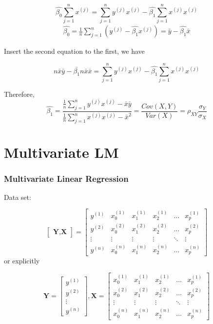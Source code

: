 \documentclass[notheorems, aspectratio=54]{beamer}
\begin{document}
\begin{frame}

$$
\hat{\beta_0}\sum\limits_{j=1}^{n}x^{(j)}=\sum\limits_{j=1}^{n}y^{(j)}x^{(j)}-\hat{\beta_1}\sum\limits_{j=1}^{n}x^{(j)}x^{(j)}
$$
\begin{align*}
\hat{\beta_0}=\frac{1}{n}\sum\limits_{j=1}^{n}(y^{(j)}-\hat{\beta_1} x^{(j)})=\bar{y}-\hat{\beta_1} \bar{x}
\end{align*}

Insert the second equation to the first, we have

$$n\bar{x}\bar{y}-\bar{\beta_1}n\bar{x}\bar{x}=\sum\limits_{j=1}^{n}y^{(j)}x^{(j)}-\hat{\beta_1}\sum\limits_{j=1}^{n}x^{(j)}x^{(j)}
$$

Therefore, 
$$\hat{\beta_1}=\frac{\frac{1}{n}\sum\limits_{j=1}^{n}y^{(j)}x^{(j)}-\bar{x}\bar{y}}{\frac{1}{n}\sum\limits_{j=1}^{n}x^{(j)}x^{(j)}-\bar{x}^2}=\frac{Cov(X,Y)}{Var(X)}=\rho_{XY}\frac{\sigma_{Y}}{\sigma_{X}}$$
\end{frame}

\section{Multivariate LM}
\begin{frame}
\frametitle{Multivariate Linear Regression}
Data set:

$$
\begin{bmatrix}

\textbf{Y}, \textbf{X}

\end{bmatrix}
=
\begin{bmatrix}
    y^{(1)}& x^{(1)}_{0}& x^{(1)}_{1} & x^{(1)}_{2} & \dots & x^{(1)}_{p} \\
    y^{(2)}& x^{(2)}_{0}& x^{(2)}_{1} & x^{(2)}_{2} & \dots & x^{(2)}_{p} \\
	\vdots & \vdots     & \vdots & \vdots &\ddots &\vdots\\
    y^{(n)}&  x^{(n)}_{0}& x^{(n)}_{1} & x^{(n)}_{2} & \dots & x^{(n)}_{p}
\end{bmatrix}
$$
or explicitly 

$$
\textbf{Y}=
\begin{bmatrix}
    y^{(1)} \\
    y^{(2)} \\
	\vdots \\
    y^{(n)}
\end{bmatrix}
,
\textbf{X}=
\begin{bmatrix}

    x^{(1)}_{0}& x^{(1)}_{1} & x^{(1)}_{2} & \dots & x^{(1)}_{p} \\
    x^{(2)}_{0}& x^{(2)}_{1} & x^{(2)}_{2} & \dots & x^{(2)}_{p} \\
	\vdots & \vdots & \vdots &\ddots &\vdots\\
  	x^{(n)}_{0}& x^{(n)}_{1} & x^{(n)}_{2} & \dots & x^{(n)}_{p}
\end{bmatrix}
$$


\end{frame}
\end{document}
